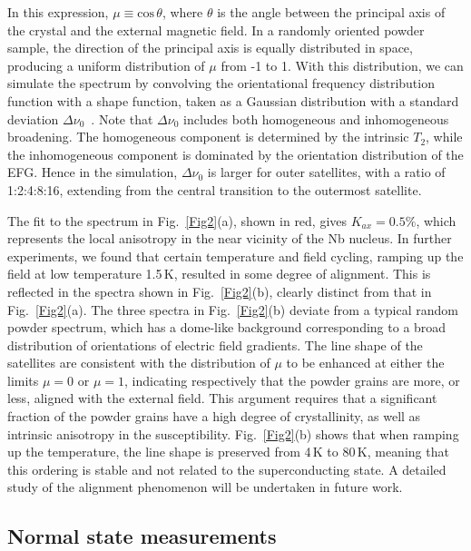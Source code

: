 \documentclass[aps,prl,reprint,superscriptaddress]{revtex4-2}
\begin{document}
	In this expression, $\mu \equiv \mathrm{cos}\,\theta$, where $\theta$ is the angle between the principal axis of the crystal and the external magnetic field. In a randomly oriented powder sample, the direction of the principal axis is equally distributed in space, producing a uniform distribution of $\mu$ from -1 to 1. With this distribution, we can simulate the spectrum by convolving the orientational frequency distribution function with a shape function, taken as a Gaussian distribution with a standard deviation $\Delta\nu_0$~\cite{Fra.73}. Note that $\Delta\nu_0$ includes both homogeneous and inhomogeneous broadening. The homogeneous component is determined by the intrinsic $T_2$, while the inhomogeneous component is dominated by the orientation distribution of the EFG. Hence in the simulation, $\Delta\nu_0$ is larger for outer satellites, with a ratio of 1:2:4:8:16, extending from the central transition to the outermost satellite.
	
	The fit to the spectrum in Fig.~\ref{Fig2}(a), shown in red, gives $K_{ax} = 0.5\%$, which represents the local anisotropy in the near vicinity of the Nb nucleus. In further experiments, we found that certain temperature and field cycling, ramping up the field at low temperature 1.5\,K, resulted in some degree of alignment. This is reflected in the spectra shown in Fig.~\ref{Fig2}(b), clearly distinct from that in Fig.~\ref{Fig2}(a). The three spectra in Fig.~\ref{Fig2}(b) deviate from a typical random powder spectrum, which has a dome-like background corresponding to a broad distribution of orientations of  electric field gradients. The line shape of the satellites are consistent with the distribution of $\mu$ to be enhanced at either the limits $\mu=0$ or $\mu=1$, indicating respectively that the powder grains are more, or less, aligned with the external field. This argument requires that a significant fraction of the powder grains have a high degree of crystallinity, as well as intrinsic anisotropy in the susceptibility.  Fig.~\ref{Fig2}(b) shows that when ramping up the temperature, the line shape is preserved from 4\,K to 80\,K, meaning that this ordering is stable and not related to the superconducting state. A detailed study of the alignment phenomenon will be undertaken in future work.

	
	
	\subsection{Normal state measurements}
	
\end{document}
